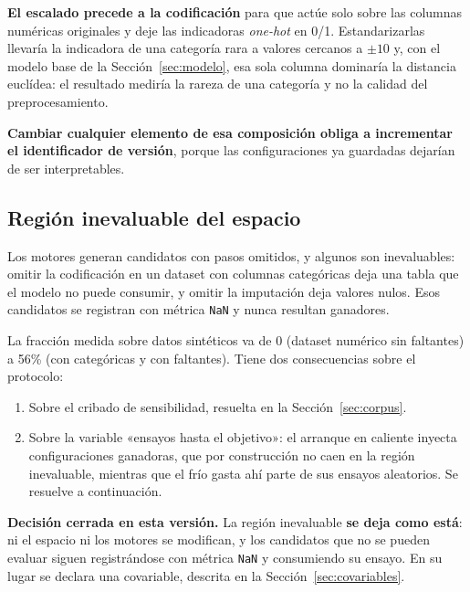 \documentclass[11pt,letterpaper]{article}
\begin{document}
\textbf{El escalado precede a la codificación} para que actúe solo sobre las
columnas numéricas originales y deje las indicadoras \textit{one-hot} en 0/1.
Estandarizarlas llevaría la indicadora de una categoría rara a valores cercanos a
$\pm 10$ y, con el modelo base de la Sección~\ref{sec:modelo}, esa sola columna
dominaría la distancia euclídea: el resultado mediría la rareza de una categoría y
no la calidad del preprocesamiento.

\textbf{Cambiar cualquier elemento de esa composición obliga a incrementar el
identificador de versión}, porque las configuraciones ya guardadas dejarían de ser
interpretables.

\subsection{Región inevaluable del espacio}

Los motores generan candidatos con pasos omitidos, y algunos son inevaluables:
omitir la codificación en un dataset con columnas categóricas deja una tabla que
el modelo no puede consumir, y omitir la imputación deja valores nulos. Esos
candidatos se registran con métrica \texttt{NaN} y nunca resultan ganadores.

La fracción medida sobre datos sintéticos va de 0 (dataset numérico sin
faltantes) a 56\% (con categóricas y con faltantes). Tiene dos consecuencias sobre
el protocolo:

\begin{enumerate}
  \item Sobre el cribado de sensibilidad, resuelta en la
        Sección~\ref{sec:corpus}.
  \item Sobre la variable «ensayos hasta el objetivo»: el arranque en caliente
        inyecta configuraciones ganadoras, que por construcción no caen en la
        región inevaluable, mientras que el frío gasta ahí parte de sus ensayos
        aleatorios. Se resuelve a continuación.
\end{enumerate}

\textbf{Decisión cerrada en esta versión.} La región inevaluable \textbf{se deja
como está}: ni el espacio ni los motores se modifican, y los candidatos que no se
pueden evaluar siguen registrándose con métrica \texttt{NaN} y consumiendo su
ensayo. En su lugar se declara una covariable, descrita en la
Sección~\ref{sec:covariables}.
\end{document}
